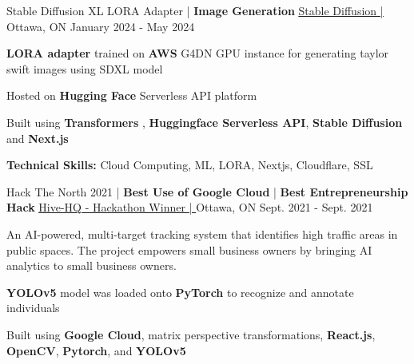 \begin{cventries}
	\cventry
	{Stable Diffusion XL LORA Adapter | \textbf{Image Generation}}
	{\underline{\href{https://lefan.ca/projects/stable-diffusion}{Stable Diffusion | \ExternalLink}}} %
	{Ottawa, ON} %
	{January 2024 - May 2024} %
	{
		\begin{cvitems} %
			\item {\textbf{LORA adapter} trained on \textbf{AWS} G4DN GPU instance for generating taylor swift images using SDXL model}
			\item {Hosted on \textbf{Hugging Face} Serverless API platform}
			\item {Built using \textbf{Transformers} , \textbf{Huggingface Serverless API}, \textbf{Stable Diffusion} and \textbf{Next.js}}
			\item {\textbf{Technical Skills:} Cloud Computing, ML, LORA, Nextjs, Cloudflare, SSL}
		\end{cvitems}
	}

	\cventry
	{Hack The North 2021 | \textbf{Best Use of Google Cloud} | \textbf{Best Entrepreneurship Hack}} %
	{\underline{\href{https://devpost.com/software/hive-hq}{Hive-HQ - Hackathon Winner | \ExternalLink}}} %
	{Ottawa, ON} %
	{Sept. 2021 - Sept. 2021} %
	{
		\begin{cvitems} %
			\item {An AI-powered, multi-target tracking system that identifies high traffic areas in public spaces. The project empowers small business owners by bringing AI analytics to small business owners.}
			\item {\textbf{YOLOv5} model was loaded onto \textbf{PyTorch} to recognize and annotate individuals}
			\item {Built using \textbf{Google Cloud}, matrix perspective transformations, \textbf{React.js}, \textbf{OpenCV}, \textbf{Pytorch}, and \textbf{YOLOv5}}
		\end{cvitems}
	}



\end{cventries}

